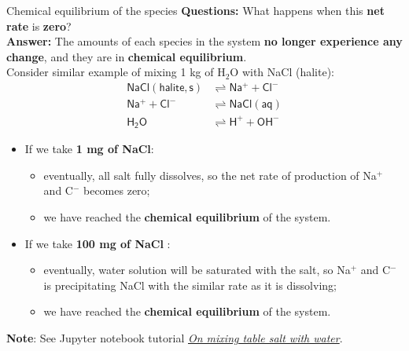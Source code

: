 %
\begin{frame}{Chemical equilibrium of the species}
%
\alert{\textbf{Questions:}} What happens when this \textbf{net rate} is \alert{\textbf{zero}}? \\\textbf{Answer:} The amounts of each species in the system \textbf{no longer experience
any change}, and they are in \alert{\textbf{chemical equilibrium}}. \\
%
Consider similar example of mixing 1 kg of H$_{2}$O with NaCl (halite):\\[-20pt] 
%
\begin{align*}
\mathsf{NaCl(halite, s)} & \rightleftharpoons\mathsf{Na^{+}+Cl^{-}}\\
\mathsf{Na^{+}+Cl^{-}} & \rightleftharpoons\mathsf{NaCl(aq)}\\
\mathsf{H_{2}O} & \rightleftharpoons\mathsf{H^{+}+OH^{-}}
\end{align*}
%
\vskip -20pt
\begin{itemize}
%
\item If we take \alert{\textbf{1 mg of NaCl}}:
\begin{itemize}
\item eventually, all salt fully dissolves, so the net rate of production of Na$^{+}$ and C$^-$ becomes zero;
\item we have reached the \textbf{chemical equilibrium} of the system. 
\end{itemize}
%
\item If we take \alert{\textbf{100 mg of NaCl }}:
\begin{itemize}
\item eventually, water solution will be saturated with the salt, so Na$^{+}$ and C$^-$  is precipitating NaCl with the similar rate as it is dissolving;
\item we have reached the \textbf{chemical equilibrium} of the system. 
\end{itemize}
\end{itemize}

\alert{\textbf{Note}}: See Jupyter notebook tutorial \href{https://github.com/mtsveta/reaktoro-jupyter/blob/geofluids-examples/tutorial/eq.sodium-chloride-solubility-in-water.ipynb}{\emph{On mixing table salt with water}}.

\end{frame}
